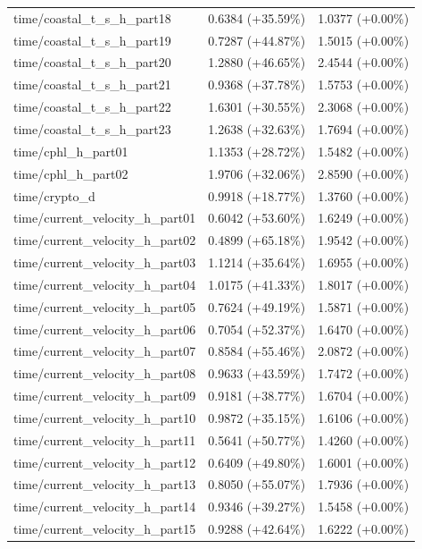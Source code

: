 \begin{table}[htbp]
{\begin{tabular}{lcc}
time/coastal\_t\_s\_h\_part18 & 0.6384 (+35.59\%) & 1.0377 (+0.00\%) \\
time/coastal\_t\_s\_h\_part19 & 0.7287 (+44.87\%) & 1.5015 (+0.00\%) \\
time/coastal\_t\_s\_h\_part20 & 1.2880 (+46.65\%) & 2.4544 (+0.00\%) \\
time/coastal\_t\_s\_h\_part21 & 0.9368 (+37.78\%) & 1.5753 (+0.00\%) \\
time/coastal\_t\_s\_h\_part22 & 1.6301 (+30.55\%) & 2.3068 (+0.00\%) \\
time/coastal\_t\_s\_h\_part23 & 1.2638 (+32.63\%) & 1.7694 (+0.00\%) \\
time/cphl\_h\_part01 & 1.1353 (+28.72\%) & 1.5482 (+0.00\%) \\
time/cphl\_h\_part02 & 1.9706 (+32.06\%) & 2.8590 (+0.00\%) \\
time/crypto\_d & 0.9918 (+18.77\%) & 1.3760 (+0.00\%) \\
time/current\_velocity\_h\_part01 & 0.6042 (+53.60\%) & 1.6249 (+0.00\%) \\
time/current\_velocity\_h\_part02 & 0.4899 (+65.18\%) & 1.9542 (+0.00\%) \\
time/current\_velocity\_h\_part03 & 1.1214 (+35.64\%) & 1.6955 (+0.00\%) \\
time/current\_velocity\_h\_part04 & 1.0175 (+41.33\%) & 1.8017 (+0.00\%) \\
time/current\_velocity\_h\_part05 & 0.7624 (+49.19\%) & 1.5871 (+0.00\%) \\
time/current\_velocity\_h\_part06 & 0.7054 (+52.37\%) & 1.6470 (+0.00\%) \\
time/current\_velocity\_h\_part07 & 0.8584 (+55.46\%) & 2.0872 (+0.00\%) \\
time/current\_velocity\_h\_part08 & 0.9633 (+43.59\%) & 1.7472 (+0.00\%) \\
time/current\_velocity\_h\_part09 & 0.9181 (+38.77\%) & 1.6704 (+0.00\%) \\
time/current\_velocity\_h\_part10 & 0.9872 (+35.15\%) & 1.6106 (+0.00\%) \\
time/current\_velocity\_h\_part11 & 0.5641 (+50.77\%) & 1.4260 (+0.00\%) \\
time/current\_velocity\_h\_part12 & 0.6409 (+49.80\%) & 1.6001 (+0.00\%) \\
time/current\_velocity\_h\_part13 & 0.8050 (+55.07\%) & 1.7936 (+0.00\%) \\
time/current\_velocity\_h\_part14 & 0.9346 (+39.27\%) & 1.5458 (+0.00\%) \\
time/current\_velocity\_h\_part15 & 0.9288 (+42.64\%) & 1.6222 (+0.00\%) \\

\end{tabular}}
\end{table}
